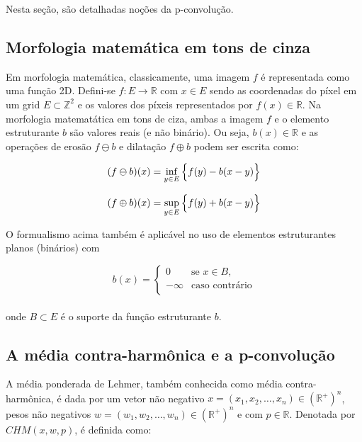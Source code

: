 Nesta seção, são detalhadas noções da p-convolução.

\subsection{Morfologia matemática em tons de cinza}
\label{subsec:morfologia-matematica-em-tons-de-cinza}

Em morfologia matemática, classicamente, uma imagem $f$ é representada como uma função 2D.
Defini-se $f: E \rightarrow \mathbb{R}$ com $x \in E$ sendo as coordenadas do píxel em um grid $E \subset \mathbb{Z}^{2}$ e os valores dos píxeis representados por $f(x) \in \mathbb{R}$.
Na morfologia matematática em tons de ciza, ambas a imagem $f$ e o elemento estruturante $b$ são valores reais (e não binário).
Ou seja, $b(x) \in \mathbb{R}$ e as operações de erosão $f \ominus b$ e dilatação $f \oplus b$ podem ser escrita como:

\begin{equation}
(f \ominus b)(x)
    = \inf_{y \in E}\Big{\{} f(y) - b(x - y)\Big{\}}
    \label{eq:equation}
\end{equation}

\begin{equation}
(f \oplus b)(x)
    = \sup_{y \in E}\Big{\{} f(y) + b(x - y)\Big{\}}
    \label{eq:equation2}
\end{equation}

O formualismo acima também é aplicável no uso de elementos estruturantes planos (binários) com

\begin{equation}
    b(x) = \begin{cases}
               0        & \text{se } x \in B,       \\
               -\infty  & \text{caso contrário}     \\
    \end{cases}
    \label{eq:equation3}
\end{equation}
\\
onde $B \subset E$ é o suporte da função estruturante $b$.

\subsection{A média contra-harmônica e a p-convolução}
\label{subsec:a-media-contra-harmonica-e-a-p-convolucao}

A média ponderada de Lehmer, também conhecida como média contra-harmônica, é dada por um vetor não negativo $x = (x_{1}, x_{2}, \dots, x_{n}) \in (\mathbb{R}^{+})^{n}$, pesos não negativos $w = (w_{1}, w_{2}, \dots, w_{n}) \in (\mathbb{R}^{+})^{n}$ e com $p \in \mathbb{R}$.
Denotada por $CHM(x, w, p)$, é definida como:

